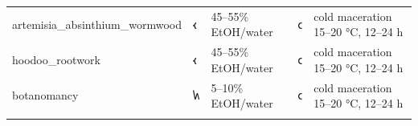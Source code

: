 \begin{longtable}[]{@{}lllll@{}}
\begin{minipage}[t]{0.17\columnwidth}\raggedright
artemisia\_absinthium\_wormwood\strut
\end{minipage} & \begin{minipage}[t]{0.17\columnwidth}\raggedright
𐑬\strut
\end{minipage} & \begin{minipage}[t]{0.17\columnwidth}\raggedright
45--55\% EtOH/water\strut
\end{minipage} & \begin{minipage}[t]{0.17\columnwidth}\raggedright
𐑤\strut
\end{minipage} & \begin{minipage}[t]{0.17\columnwidth}\raggedright
cold maceration 15--20 °C, 12--24 h\strut
\end{minipage}\tabularnewline
\begin{minipage}[t]{0.17\columnwidth}\raggedright
hoodoo\_rootwork\strut
\end{minipage} & \begin{minipage}[t]{0.17\columnwidth}\raggedright
𐑬\strut
\end{minipage} & \begin{minipage}[t]{0.17\columnwidth}\raggedright
45--55\% EtOH/water\strut
\end{minipage} & \begin{minipage}[t]{0.17\columnwidth}\raggedright
𐑤\strut
\end{minipage} & \begin{minipage}[t]{0.17\columnwidth}\raggedright
cold maceration 15--20 °C, 12--24 h\strut
\end{minipage}\tabularnewline
\begin{minipage}[t]{0.17\columnwidth}\raggedright
botanomancy\strut
\end{minipage} & \begin{minipage}[t]{0.17\columnwidth}\raggedright
𐑿\strut
\end{minipage} & \begin{minipage}[t]{0.17\columnwidth}\raggedright
5--10\% EtOH/water\strut
\end{minipage} & \begin{minipage}[t]{0.17\columnwidth}\raggedright
𐑤\strut
\end{minipage} & \begin{minipage}[t]{0.17\columnwidth}\raggedright
cold maceration 15--20 °C, 12--24 h\strut
\end{minipage}\tabularnewline
\begin{minipage}[t]{0.17\columnwidth}\raggedright

\end{minipage}
\end{longtable}
